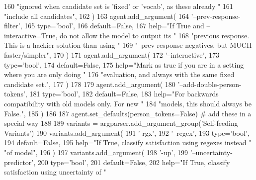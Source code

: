 \begin{DoxyCode}
160             \textcolor{stringliteral}{"ignored when candidate set is 'fixed' or 'vocab', as these already "}
161             \textcolor{stringliteral}{"include all candidates"},
162         )
163         agent.add\_argument(
164             \textcolor{stringliteral}{'--prev-response-filter'},
165             type=\textcolor{stringliteral}{'bool'},
166             default=\textcolor{keyword}{False},
167             help=\textcolor{stringliteral}{"If True and --interactive=True, do not allow the model to output its "}
168             \textcolor{stringliteral}{"previous response. This is a hackier solution than using "}
169             \textcolor{stringliteral}{"--prev-response-negatives, but MUCH faster/simpler"},
170         )
171         agent.add\_argument(
172             \textcolor{stringliteral}{'--interactive'},
173             type=\textcolor{stringliteral}{'bool'},
174             default=\textcolor{keyword}{False},
175             help=\textcolor{stringliteral}{"Mark as true if you are in a setting where you are only doing "}
176             \textcolor{stringliteral}{"evaluation, and always with the same fixed candidate set."},
177         )
178 
179         agent.add\_argument(
180             \textcolor{stringliteral}{'--add-double-person-tokens'},
181             type=\textcolor{stringliteral}{'bool'},
182             default=\textcolor{keyword}{False},
183             help=\textcolor{stringliteral}{"For backwards compatibility with old models only. For new "}
184             \textcolor{stringliteral}{"models, this should always be False."},
185         )
186 
187         agent.set\_defaults(person\_tokens=\textcolor{keyword}{False})  \textcolor{comment}{# add these in a special way}
188 
189         variants = argparser.add\_argument\_group(\textcolor{stringliteral}{'Self-feeding Variants'})
190         variants.add\_argument(
191             \textcolor{stringliteral}{'-rgx'},
192             \textcolor{stringliteral}{'--regex'},
193             type=\textcolor{stringliteral}{'bool'},
194             default=\textcolor{keyword}{False},
195             help=\textcolor{stringliteral}{"If True, classify satisfaction using regexes instead "} \textcolor{stringliteral}{"of model"},
196         )
197         variants.add\_argument(
198             \textcolor{stringliteral}{'-up'},
199             \textcolor{stringliteral}{'--uncertainty-predictor'},
200             type=\textcolor{stringliteral}{'bool'},
201             default=\textcolor{keyword}{False},
202             help=\textcolor{stringliteral}{"If True, classify satisfaction using uncertainty of "}

\end{DoxyCode}
